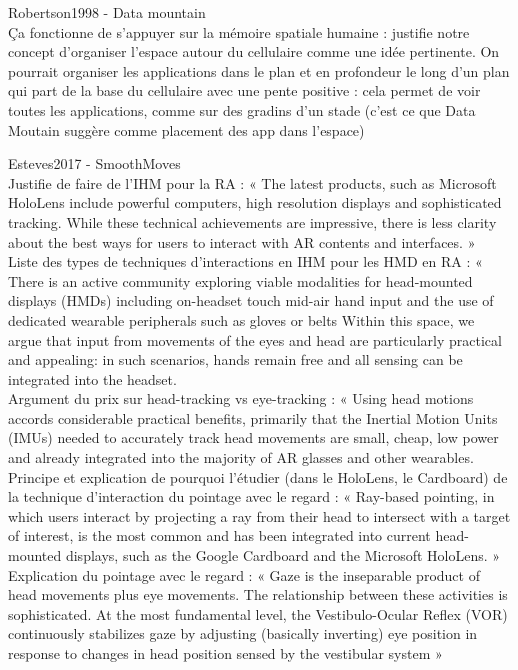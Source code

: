 Robertson1998 - Data mountain\\
Ça fonctionne de s'appuyer sur la mémoire spatiale humaine : justifie notre concept d'organiser l'espace autour du cellulaire comme une idée pertinente. On pourrait organiser les applications dans le plan et en profondeur le long d'un plan qui part de la base du cellulaire avec une pente positive : cela permet de voir toutes les applications, comme sur des gradins d'un stade (c'est ce que Data Moutain suggère comme placement des app dans l'espace)

Esteves2017 - SmoothMoves\\
Justifie de faire de l'IHM pour la RA : « The latest products, such as Microsoft HoloLens include powerful computers, high resolution displays and sophisticated tracking. While these technical achievements are impressive, there is less clarity about the best ways for users to interact with AR contents and interfaces. »\\
Liste des types de techniques d'interactions en IHM pour les HMD en RA : « There is an active community exploring viable modalities for head-mounted displays (HMDs) including on-headset touch mid-air hand input and the use of dedicated wearable peripherals such as gloves or belts Within this space, we argue that input from movements of the eyes and head are particularly practical and appealing: in such scenarios, hands remain free and all sensing can be integrated into the headset.\\
Argument du prix sur head-tracking vs eye-tracking : « Using head motions accords considerable practical benefits, primarily that the Inertial Motion Units (IMUs) needed to accurately track head movements are small, cheap, low power and already integrated into the majority of AR glasses and other wearables.\\
Principe et explication de pourquoi l'étudier (dans le HoloLens, le Cardboard) de la technique d'interaction du pointage avec le regard : « Ray-based pointing, in which users interact by projecting a ray from their head to intersect with a target of interest, is the most common and has been integrated into current head-mounted displays, such as the Google Cardboard and the Microsoft HoloLens. »\\
Explication du pointage avec le regard : « Gaze is the inseparable product of head movements plus eye movements. The relationship between these activities is sophisticated. At the most fundamental level, the Vestibulo-Ocular Reflex (VOR) continuously stabilizes gaze by adjusting (basically inverting) eye position in response to changes in head position sensed by the vestibular system »\\
